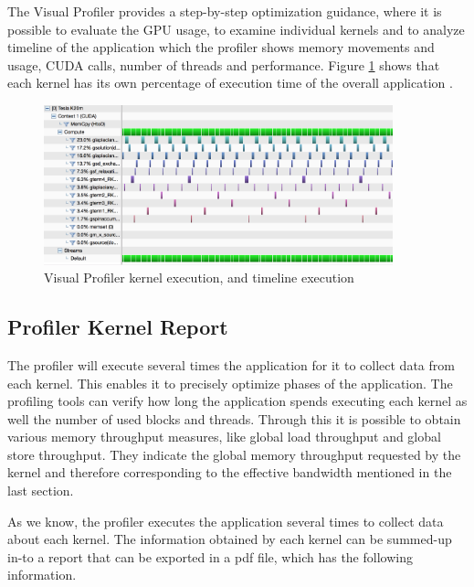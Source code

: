 The Visual Profiler provides a step-by-step optimization guidance, where it is possible to evaluate the GPU usage, to examine individual kernels and to analyze timeline of the application which the profiler shows memory movements and usage, CUDA calls, number of threads and performance. Figure \ref{fig:visual01} shows that each kernel has its own percentage of execution time of the overall application \cite{practices}.

\begin{figure}[htbp]
	\centering
		\includegraphics[width=0.9\textwidth]{Figures/pofiler.png}
		\smallskip
	\caption[Visual Profiler timeline and stream process]{Visual Profiler kernel execution, and timeline execution}
	\label{fig:visual01}
\end{figure}

\subsection{Profiler Kernel Report}

The profiler will execute several times the application for it to collect data from each kernel. This enables it to precisely optimize phases of the application\cite{example}. The profiling tools can verify how long the application spends executing each kernel as well the number of used blocks and threads. Through this it is possible to obtain various memory throughput measures, like global load throughput and global store throughput. They indicate the global memory throughput requested by the kernel and therefore corresponding to the effective bandwidth mentioned in the last section.

As we know, the profiler executes the application several times to collect data about each kernel. The information obtained by each kernel can be summed-up in-to a report that can be exported in a pdf file, which has the following information.

